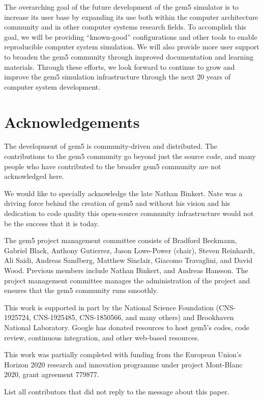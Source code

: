 \documentclass[acmlarge,nonacm,screen=true]{acmart}
\begin{document}
The overarching goal of the future development of the gem5 simulator is to increase its user base by expanding its use both within the computer architecture community and in other computer systems research fields.
To accomplish this goal, we will be providing ``known-good'' configurations and other tools to enable reproducible computer system simulation.
We will also provide more user support to broaden the gem5 community through improved documentation and learning materials.
Through these efforts, we look forward to continue to grow and improve the gem5 simulation infrastructure through the next 20 years of computer system development.

\section{Acknowledgements}
\label{sec:acks}

The development of gem5 is community-driven and distributed.
The contributions to the gem5 community go beyond just the source code, and many people who have contributed to the broader gem5 community are not acknowledged here.

We would like to specially acknowledge the late Nathan Binkert.
Nate was a driving force behind the creation of gem5 and without his vision and his dedication to code quality this open-source community infrastructure would not be the success that it is today.

The gem5 project management committee consists of Bradford Beckmann, Gabriel Black, Anthony Gutierrez, Jason Lowe-Power (chair), Steven Reinhardt, Ali Saidi, Andreas Sandberg, Matthew Sinclair, Giacomo Travaglini, and David Wood.
Previous members include Nathan Binkert, and Andreas Hansson.
The project management committee manages the administration of the project and ensures that the gem5 community runs smoothly.

This work is supported in part by the National Science Foundation (CNS-1925724, CNS-1925485, CNS-1850566, and many others) and Brookhaven National Laboratory.
Google has donated resources to host gem5's codes, code review, continuous integration, and other web-based resources.

This work was partially completed with funding from the European Union's Horizon 2020 research and innovation programme under project Mont-Blanc 2020, grant agreement 779877.

List all contributors that did not reply to the message about this paper.



\end{document}
